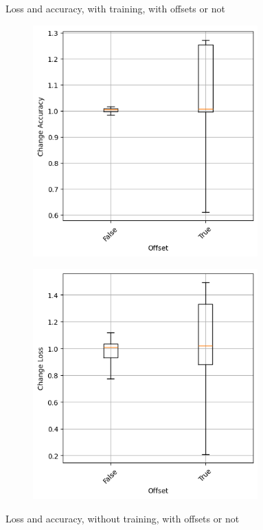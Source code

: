 \begin{figure}
\begin{subfigure}{0.5\textwidth}
    \end{subfigure}
    \caption{Loss and accuracy, with training, with offsets or not}
    \label{fig:offset-training}
\end{figure}
\begin{figure}
    \begin{subfigure}{0.5\textwidth}
        \centering
        \includegraphics[width=0.95\textwidth]{plots/Offset_NotTrained_accuracy.png}
    \end{subfigure}
    \begin{subfigure}{0.5\textwidth}
        \centering
        \includegraphics[width=0.95\textwidth]{plots/Offset_NotTrained_loss.png}
    \end{subfigure}
    \caption{Loss and accuracy, without training, with offsets or not}
    \label{fig:offset-notraining}
\end{figure}
